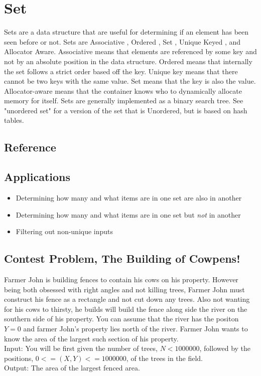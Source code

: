 \section{Set}
Sets are a data structure that are useful for determining if an element has been seen before or not.
Sets are Associative , Ordered , Set , Unique Keyed , and Allocator Aware\cite{cplusplus}.
Associative means that elements are referenced by some key and not by an absolute position in the data structure.
Ordered means that internally the set follows a strict order based off the key.
Unique key means that there cannot be two keys with the same value.
Set means that the key is also the value.
Allocator-aware means that the container knows who to dynamically allocate memory for itself.
Sets are generally implemented as a binary search tree.
See "unordered set" for a version of the set that is Unordered, but is based on hash tables.

\subsection{Reference}


\subsection{Applications}
\begin{itemize}
    \item   Determining how many and what items are in one set are also in another
    \item   Determining how many and what items are in one set but \emph{not} in another
    \item   Filtering out non-unique inputs
\end{itemize}

\subsection{Contest Problem, The Building of Cowpens!}
Farmer John is building fences to contain his cows on his property.
However being both obsessed with right angles and not killing trees, Farmer John must construct his fence as a rectangle and not cut down any trees.
Also not wanting for his cows to thirsty, he builds will build the fence along side the river on the southern side of his property.
You can assume that the river has the positon $Y=0$ and farmer John's property lies north of the river.
Farmer John wants to know the area of the largest such section of his property.\\
Input: You will be first given the number of trees, $N<1000000$, followed by the positions, $0<=(X,Y) <= 1000000$, of the trees in the field. \\
Output: The area of the largest fenced area.

